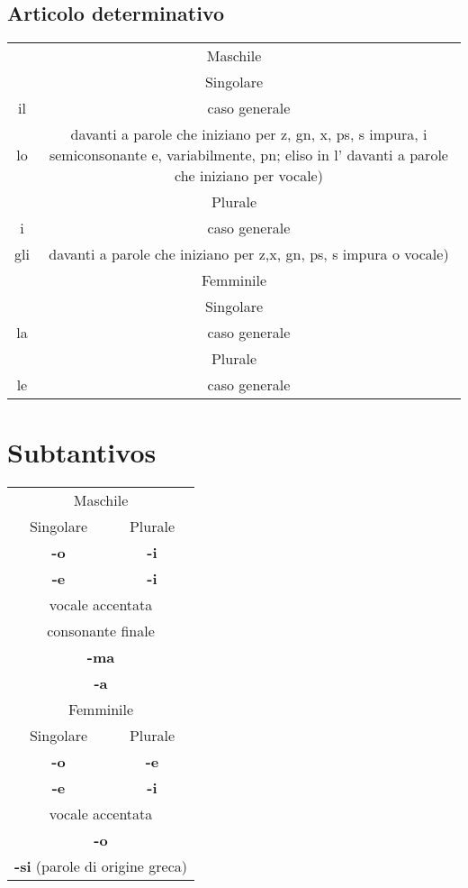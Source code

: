 \subsection{Articolo determinativo}
\begin{tabular}{cc}
\multicolumn{2}{c}{Maschile}\\
\multicolumn{2}{c}{Singolare}\\
il& caso generale\\
lo& davanti a parole che iniziano per z, gn, x, ps, s impura, i semiconsonante e, variabilmente, pn; eliso in l' davanti a parole che iniziano per vocale)\\
\multicolumn{2}{c}{Plurale}\\
i& caso generale\\
gli& davanti a parole che iniziano per z,x, gn, ps, s impura o vocale)\\
\multicolumn{2}{c}{Femminile}\\
\multicolumn{2}{c}{Singolare}\\
la& caso generale\\
\multicolumn{2}{c}{Plurale}\\
le& caso generale\\
\end{tabular}
\section{Subtantivos}
\begin{tabular}{cc}
\multicolumn{2}{c}{Maschile}\\
Singolare&Plurale\\
\textbf{-o}&\textbf{-i}\\
\textbf{-e}&\textbf{-i}\\
\multicolumn{2}{c}{vocale accentata}\\
\multicolumn{2}{c}{consonante finale}\\
\multicolumn{2}{c}{\textbf{-ma}}\\
\multicolumn{2}{c}{\textbf{-a}}\\
\multicolumn{2}{c}{Femminile}\\
Singolare&Plurale\\
\textbf{-o}&\textbf{-e}\\
\textbf{-e}&\textbf{-i}\\
\multicolumn{2}{c}{vocale accentata}\\
\multicolumn{2}{c}{\textbf{-o}}\\
\multicolumn{2}{c}{\textbf{-si} (parole di origine greca)}\\
\end{tabular}
